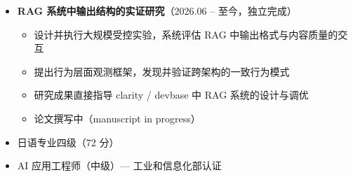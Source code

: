 \documentclass[zh]{resume}
\begin{document}
\begin{itemize}
  \item \textbf{RAG 系统中输出结构的实证研究}（2026.06 -- 至今，独立完成）
  \begin{itemize}
    \item 设计并执行大规模受控实验，系统评估 RAG 中输出格式与内容质量的交互
    \item 提出行为层面观测框架，发现并验证跨架构的一致行为模式
    \item 研究成果直接指导 clarity / devbase 中 RAG 系统的设计与调优
    \item 论文撰写中（manuscript in progress）
  \end{itemize}
\end{itemize}

\begin{itemize}
  \item 日语专业四级（72 分）
  \item AI 应用工程师（中级）--- 工业和信息化部认证
\end{itemize}
\end{document}
